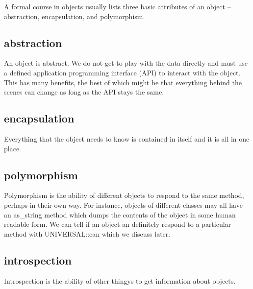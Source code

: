 A formal course in objects usually lists three basic attributes of
an object -- abstraction, encapsulation, and polymorphism.

        \subsection{abstraction}

An object is abstract.  We do not get to play with the data directly
and must use a defined application programming interface (API) to
interact with the object.  This has many benefits, the best of which
might be that everything behind the scenes can change as long as the 
API stays the same.

        \subsection{encapsulation}

Everything that the object needs to know is contained in itself and
it is all in one place.

        \subsection{polymorphism}

Polymorphism is the ability of different objects to respond to the
same method, perhaps in their own way.  For instance, objects of 
different classes may all have an as\_string method which dumps
the contents of the object in some human readable form.  We can tell
if an object an definitely respond to a particular method with UNIVERSAL::can
which we discuss later.

        \subsection{introspection}
        
Introspection is the ability of other thingys to get information
about objects.


